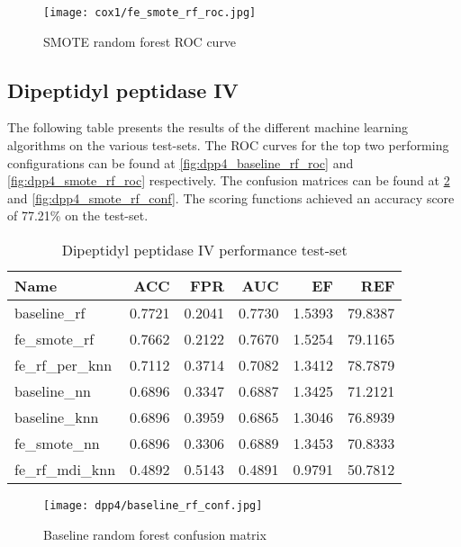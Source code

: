 \begin{figure}[H]
    \begin{center}
        \caption[]{SMOTE random forest ROC curve}
        \label{fig:cox1_smote_rf_roc}
        \texttt{[image: cox1/fe\_smote\_rf\_roc.jpg]}
    \end{center}
\end{figure}

\subsection{Dipeptidyl peptidase IV}
The following table presents the results of the different machine learning algorithms on the various
test-sets. The ROC curves for the top two performing configurations can be found at \ref{fig:dpp4_baseline_rf_roc} and \ref{fig:dpp4_smote_rf_roc}
respectively. The confusion matrices can be found at \ref{fig:dpp4_baseline_rf_conf} and \ref{fig:dpp4_smote_rf_conf}.
The scoring functions achieved an accuracy score of 77.21\% on the test-set.

\begin{table}[H]
    \begin{center}
        \caption{Dipeptidyl peptidase IV performance test-set}
        \begin{tabular}{lrrrrr}
            \toprule
            Name             & ACC    & FPR    & AUC    & EF     & REF     \\
            \midrule
            baseline\_rf     & 0.7721 & 0.2041 & 0.7730 & 1.5393 & 79.8387 \\
            fe\_smote\_rf    & 0.7662 & 0.2122 & 0.7670 & 1.5254 & 79.1165 \\
            fe\_rf\_per\_knn & 0.7112 & 0.3714 & 0.7082 & 1.3412 & 78.7879 \\
            baseline\_nn     & 0.6896 & 0.3347 & 0.6887 & 1.3425 & 71.2121 \\
            baseline\_knn    & 0.6896 & 0.3959 & 0.6865 & 1.3046 & 76.8939 \\
            fe\_smote\_nn    & 0.6896 & 0.3306 & 0.6889 & 1.3453 & 70.8333 \\
            fe\_rf\_mdi\_knn & 0.4892 & 0.5143 & 0.4891 & 0.9791 & 50.7812 \\
            \bottomrule
        \end{tabular}
    \end{center}
\end{table}

\begin{figure}[H]
    \begin{center}
        \caption[]{Baseline random forest confusion matrix}
        \label{fig:dpp4_baseline_rf_conf}
        \texttt{[image: dpp4/baseline\_rf\_conf.jpg]}
    \end{center}
\end{figure}

